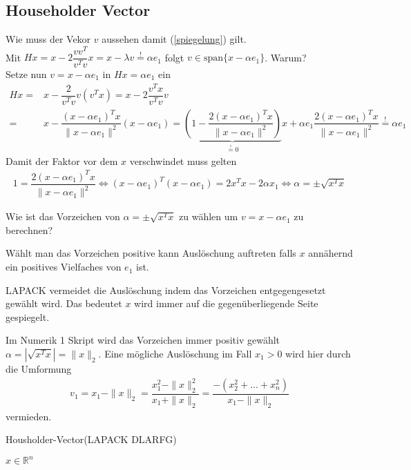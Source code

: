 \subsection{Householder Vector}
Wie muss der Vekor $v$ aussehen damit (\ref{spiegelung}) gilt.\\
\glqq Mit $Hx = x - 2\dfrac{vv^T}{v^Tv} x = x - \lambda v \overset{!}{=} \alpha e_1$ folgt $v \in \text{span}\{x - \alpha e_1\}$. \grqq{} \cite{num1}Warum?\\
  Setze nun $v = x - \alpha e_1$ in $Hx = \alpha e_1 $ ein
\begin{align*}
	Hx =& x - \dfrac{2}{v^Tv}v(v^Tx) = x - 2\dfrac{v^Tx}{v^Tv}v\\
	=& x - \dfrac{(x - \alpha e_1)^Tx}{\|x - \alpha e_1\|^2} (x - \alpha e_1)
	=\underbrace{\left(1 - \dfrac{2(x - \alpha e_1)^Tx}{\|x - \alpha e_1\|^2}\right)}_{ \overset{!}{=} 0 } x + \alpha e_1 \dfrac{2(x - \alpha e_1)^Tx}{\|x - \alpha e_1\|^2}  \overset{!}{=} \alpha e_1
\end{align*}
Damit der Faktor vor dem $x$ verschwindet muss gelten
\begin{align*}
	1 = \dfrac{2(x - \alpha e_1)^Tx}{\|x - \alpha e_1\|^2} \Leftrightarrow (x - \alpha e_1)^T(x - \alpha e_1) = 2 x^T x - 2\alpha x_1 \Leftrightarrow \alpha = \pm \sqrt{x^Tx}
\end{align*}

Wie ist das Vorzeichen von $\alpha = \pm \sqrt{x^Tx}$ zu wählen um $ v = x - \alpha e_1$ zu berechnen?

Wählt man das Vorzeichen positive kann Auslöschung auftreten falls $x$ annähernd ein positives Vielfaches von $e_1$ ist.

LAPACK \cite{DGEQR2} vermeidet die Auslöschung indem das Vorzeichen entgegengesetzt gewählt wird. Das bedeutet $x$ wird immer auf die gegenüberliegende Seite gespiegelt.

Im Numerik 1 Skript \cite{num1} wird das Vorzeichen immer positiv gewählt\\ $\alpha = |\sqrt{x^Tx}| = \|x\|_2$. Eine mögliche Auslöschung im Fall $ x_1 > 0$ wird hier durch die Umformung 
\begin{align}
	v_1 = x_1 - \|x\|_2 = \dfrac{x_1^2 - \|x\|_2^2}{x_1 + \|x\|_2}
	=\dfrac{-(x_2^2+...+x_n^2)}{x_1 - \|x\|_2}
\end{align}
vermieden.


\begin{algorithm}
	\caption{Housholder-Vector(LAPACK DLARFG)}
	\begin{algorithmic}
		\State $x \in \mathbb{R}^n$
	\end{algorithmic} 
	\label{alg:unblockedqr}
\end{algorithm}

